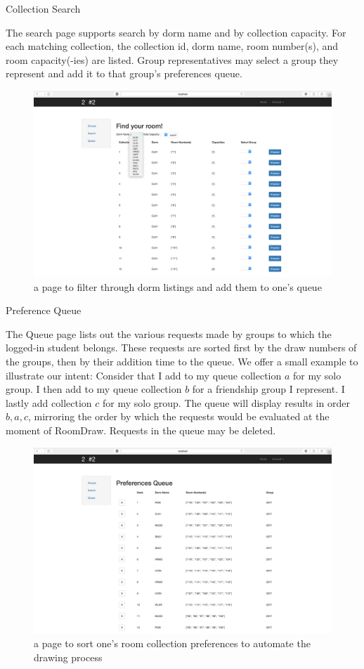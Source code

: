 \begin{outline}
\1 Collection Search

  \2 The search page supports search by dorm name and by collection capacity.
  For each matching collection, the collection id, dorm name, room number(s),
  and room capacity(-ies) are listed. Group representatives may select a group
  they represent and add it to that group's preferences queue.

\begin{figure}[H] \centering
\includegraphics[scale=.225]{screens/search}
\caption{a page to filter through dorm listings and add them to one's queue}
\label{fig:screensearch}
\end{figure}

\1 Preference Queue

  \2 The Queue page lists out the various requests made by groups to which the
  logged-in student belongs. These requests are sorted first by the draw numbers
  of the groups, then by their addition time to the queue. We offer a small
  example to illustrate our intent: Consider that I add to my queue collection
  \(a\) for my solo group. I then add to my queue collection \(b\) for a
  friendship group I represent. I lastly add collection \(c\) for my solo group.
  The queue will display results in order \(b, a, c\), mirroring the order by
  which the requests would be evaluated at the moment of RoomDraw.
  \2 Requests in the queue may be deleted.
  
\begin{figure}[H] \centering
\includegraphics[scale=.225]{screens/queue}
\caption{a page to sort one's room collection preferences to automate the
    drawing process}
\label{fig:screenqueue}
\end{figure}
  
\end{outline}
